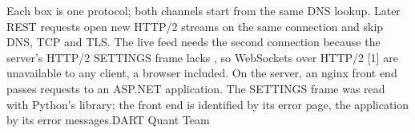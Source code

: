 {
}{Each box is one protocol; both channels start from the same DNS lookup. Later REST requests open new HTTP/2 streams on the same connection and skip DNS, TCP and TLS. The live feed needs the second connection because the server's HTTP/2 SETTINGS frame lacks , so WebSockets over HTTP/2 [1] are unavailable to any client, a browser included. On the server, an nginx front end passes requests to an ASP.NET application. The SETTINGS frame was read with Python's  library; the front end is identified by its error page, the application by its error messages.}{DART Quant Team}
